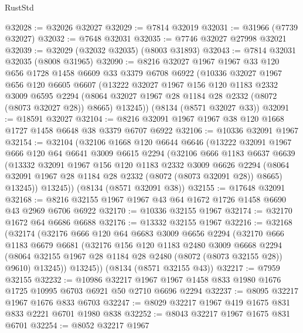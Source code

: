 \begin{lexlean}{RustStd}
\begin{coremodule}
@32028 := @32026 @32027
@32029 := @7814 @32019
@32031 := @31966 (@7739 @32027)
@32032 := @7648 @32031
@32035 := @7746 @32027 @27998 @32021
@32039 := @32029 (@32032 @32035) (@8003 @31893)
@32043 := @7814 @32031 @32035 (@8008 @31965)
@32090 := @8216
    @32027
    @1967
    @1967
    @33
    @120
    @656
    @1728
    @1458
    @6609
    @33
    @3379
    @6708
    @6922
    (@10336
      @32027
      @1967
      @656
      @120
      @6605
      @6607
      (@13222
        @32027
        @1967
        @156
        @120
        @1183
        @2332
        @3009
        @6595
        @2294
        (@8064 @32027 @1967 @28 @1184 @28 @2332 (@8072 (@8073 @32027 @28)) @8665)
        @13245))
    (@8134 (@8571 @32027 @33))
@32091 := @18591 @32027
@32104 := @8216 @32091 @1967 @1967 @38 @120 @1668 @1727 @1458 @6648 @38 @3379 @6707 @6922
@32106 := @10336 @32091 @1967
@32154 := @32104
    (@32106
      @1668
      @120
      @6644
      @6646
      (@13222
        @32091
        @1967
        @666
        @120
        @64
        @6641
        @3009
        @6615
        @2294
        (@32106
          @666
          @1183
          @6637
          @6639
          (@13332
            @32091
            @1967
            @156
            @120
            @1183
            @2332
            @3009
            @6626
            @2294
            (@8064 @32091 @1967 @28 @1184 @28 @2332 (@8072 (@8073 @32091 @28)) @8665)
            @13245))
        @13245))
    (@8134 (@8571 @32091 @38))
@32155 := @17648 @32091
@32168 := @8216 @32155 @1967 @1967 @43 @64 @1672 @1726 @1458 @6690 @43 @2969 @6706 @6922
@32170 := @10336 @32155 @1967
@32174 := @32170 @1672 @64 @6686 @6688
@32176 := @13332 @32155 @1967
@32216 := @32168
    (@32174
      (@32176
        @666
        @120
        @64
        @6683
        @3009
        @6656
        @2294
        (@32170
          @666
          @1183
          @6679
          @6681
          (@32176
            @156
            @120
            @1183
            @2480
            @3009
            @6668
            @2294
            (@8064 @32155 @1967 @28 @1184 @28 @2480 (@8072 (@8073 @32155 @28)) @9610)
            @13245))
        @13245))
    (@8134 (@8571 @32155 @43))
@32217 := @7959 @32155
@32232 := @10986
    @32217
    @1967
    @1967
    @1458
    @833
    @1980
    @1676
    @1725
    @10995
    @6703
    @6921
    @50
    @2710
    @6696
    @2294
@32237 := @8095 @32217 @1967 @1676 @833 @6703
@32247 := @8029 @32217 @1967 @419 @1675 @831 @833 @2221 @6701 @1980 @838
@32252 := @8043 @32217 @1967 @1675 @831 @6701
@32254 := @8052 @32217 @1967

\end{coremodule}
\end{lexlean}
